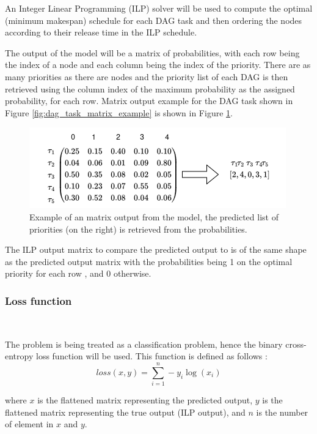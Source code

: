 An Integer Linear Programming (ILP) solver will be used to compute
the optimal (minimum makespan) schedule for each DAG task and then
ordering the nodes according to their release time in the ILP schedule.

The output of the model will be a matrix of probabilities,
with each row being the index of a node and each column being the index of the priority.
There are as many priorities as there are nodes and 
the priority list of each DAG is then retrieved using the column
index of the maximum probability as the assigned probability, for each row.
Matrix output example for the DAG task shown in Figure \ref{fig:dag_task_matrix_example}
is shown in Figure \ref{fig:dag_output_matrix_example}.

\begin{figure}
    \centering
    \includegraphics[width=\linewidth]{images/output_matrix_example.drawio.png}
    \caption{Example of an matrix output from the model, the predicted list of priorities (on the right)
    is retrieved from the probabilities.}
    \label{fig:dag_output_matrix_example}
\end{figure}

The ILP output matrix to compare the predicted output to is of the same shape
as the predicted output matrix with the probabilities being 1 on the optimal priority for each row 
, and 0 otherwise.

\subsubsection{Loss function}
~

The problem is being treated as a classification problem,
hence the binary cross-entropy loss function will be used.
This function is defined as follows :
\begin{equation}
    loss(x, y) = \sum_{i=1}^{n} -y_i\log(x_i)
\end{equation}
    
where $x$ is the flattened matrix representing the predicted output,
$y$ is the flattened matrix representing the true output (ILP output),
and $n$ is the number of element in $x$ and $y$.


